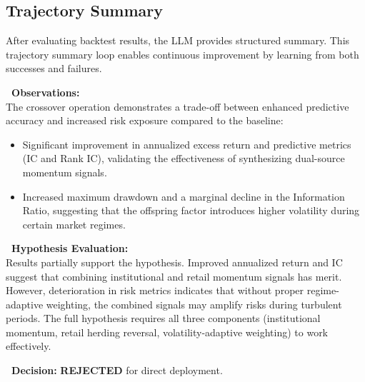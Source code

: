 \subsection{Trajectory Summary}

After evaluating backtest results, the LLM provides structured summary. This trajectory summary loop enables continuous improvement by learning from both successes and failures.

\begin{tcolorbox}[
  colback=lightblue,
  colframe=darkblue,
  fonttitle=\bfseries,
  title={\faComments\ Evaluation \& Summary},
  arc=2mm,
  boxrule=0.5pt,
  breakable
]

\textbf{\faSearch\ Observations:}\\
The crossover operation demonstrates a trade-off between enhanced predictive accuracy and increased risk exposure compared to the baseline:
\begin{itemize}
    \item \textcolor{metricgreen}{\faCheckCircle} Significant improvement in annualized excess return and predictive metrics (IC and Rank IC), validating the effectiveness of synthesizing dual-source momentum signals.
    \item \textcolor{alertred}{\faTimesCircle} Increased maximum drawdown and a marginal decline in the Information Ratio, suggesting that the offspring factor introduces higher volatility during certain market regimes.
\end{itemize}

\vspace{0.2cm}

\textbf{\faBalanceScale\ Hypothesis Evaluation:}\\[0.15cm]
\small
Results partially support the hypothesis. Improved annualized return and IC suggest that combining institutional and retail momentum signals has merit. However, deterioration in risk metrics indicates that without proper regime-adaptive weighting, the combined signals may amplify risks during turbulent periods. The full hypothesis requires all three components (institutional momentum, retail herding reversal, volatility-adaptive weighting) to work effectively.

\vspace{0.2cm}

\textbf{\faFlag\ Decision:} \colorbox{alertred!20}{\textcolor{alertred}{\textbf{REJECTED}}} for direct deployment.


\end{tcolorbox}
